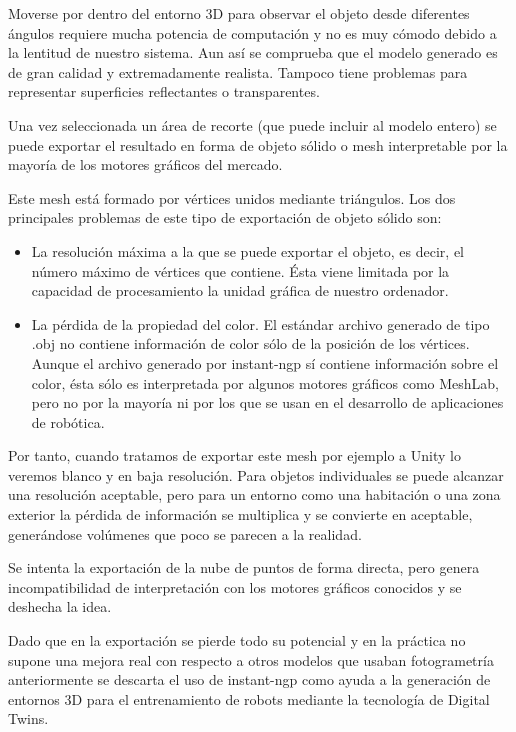 \documentclass[a4paper, 12pt, spanish, twoside]{article}
\begin{document}
Moverse por dentro del entorno 3D para observar el objeto desde diferentes ángulos requiere mucha potencia de computación y no es muy cómodo debido a la lentitud de nuestro sistema. Aun así se comprueba que el modelo generado es de gran calidad y extremadamente realista. Tampoco tiene problemas para representar superficies reflectantes o transparentes.

Una vez seleccionada un área de recorte (que puede incluir al modelo entero) se puede exportar el resultado en forma de objeto sólido o mesh interpretable por la mayoría de los motores gráficos del mercado.

Este mesh está formado por vértices unidos mediante triángulos. Los dos principales problemas de este tipo de exportación de objeto sólido son:

\begin{itemize}
\item La resolución máxima a la que se puede exportar el objeto, es decir, el número máximo de vértices que contiene. Ésta viene limitada por la capacidad de procesamiento la unidad gráfica de nuestro ordenador.

\item La pérdida de la propiedad del color. El estándar archivo generado de tipo .obj no contiene información de color sólo de la posición de los vértices. Aunque el archivo generado por instant-ngp sí contiene información sobre el color, ésta sólo es interpretada por algunos motores gráficos como MeshLab, pero no por la mayoría ni por los que se usan en el desarrollo de aplicaciones de robótica.
\end{itemize}

Por tanto, cuando tratamos de exportar este mesh por ejemplo a Unity lo veremos blanco y en baja resolución. Para objetos individuales se puede alcanzar una resolución aceptable, pero para un entorno como una habitación o una zona exterior la pérdida de información se multiplica y se convierte en aceptable, generándose volúmenes que poco se parecen a la realidad.

Se intenta la exportación de la nube de puntos de forma directa, pero genera incompatibilidad de interpretación con los motores gráficos conocidos y se deshecha la idea.

Dado que en la exportación se pierde todo su potencial y en la práctica no supone una mejora real con respecto a otros modelos que usaban fotogrametría anteriormente se descarta el uso de instant-ngp como ayuda a la generación de entornos 3D para el entrenamiento de robots mediante la tecnología de Digital Twins.
\end{document}
